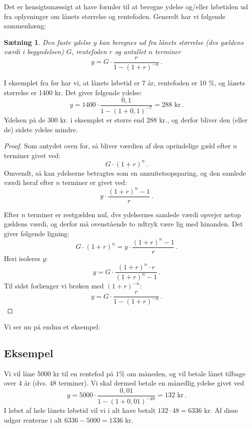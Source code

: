 \documentclass[12pt,oneside,a4paper]{article}
\newtheorem{thm}{Sætning}[section]
\begin{document}
Det er hensigtsmæssigt at have formler til at beregne ydelse og/eller løbetiden
ud fra oplysninger om lånets størrelse og rentefoden.  Generelt har vi følgende
sammenhæng:

\begin{tcolorbox}
\begin{thm}
Den faste ydelse $y$ kan beregnes ud fra lånets størrelse (dvs gældens
værdi i begyndelsen) $G$, rentefoden $r$ og antallet $n$ terminer
\[
    y = G\cdot\frac{r}{1-(1+r)^{-n}}\,.
\]
\end{thm}
\end{tcolorbox}

I eksemplet fra før har vi, at lånets løbetid er 7 år, rentefoden er 10 $\%$, og
lånets størrelse er 1400 kr. Det giver følgende ydelse:
\[
y = 1400\cdot\frac{0,1}{1-(1+0,1)^{-7}} = 288 \,\,\mbox{kr}\,.
\]
Ydelsen på de 300 kr. i eksemplet er større end 288 kr., og derfor bliver den
(eller de) sidste ydelse mindre.

\begin{tcolorbox}
\begin{proof}
Som antydet oven for, så bliver værdien af den oprindelige gæld efter $n$ terminer givet ved:
\[
G \cdot (1+r)^n \,.
\]
Omvendt, så kan ydelserne betragtes som en annuitetsopsparing, og
den samlede værdi heraf efter $n$ terminer er givet ved:
\[
y \cdot \frac{(1+r)^n-1}{r} \,.
\]

Efter $n$ terminer er restgælden nul, dvs ydelsernes samlede værdi opvejer
netop gældens værdi,  og derfor må ovenstående to udtryk være lig med
hinanden.  Det giver følgende ligning:
\[
G \cdot (1+r)^n = y \cdot \frac{(1+r)^n-1}{r} \,.
\]
Heri isoleres $y$:
\[
y = G \cdot \frac{(1+r)^n \cdot r}{(1+r)^n - 1} \,.
\]
Til sidst forlænger vi brøken med $(1+r)^{-n}$:
\[
y = G \cdot \frac{r}{1 - (1+r)^{-n}} \,.
\]

\end{proof}
\end{tcolorbox}

Vi ser nu på endnu et eksempel:
\begin{tcolorbox}
\subsection*{Eksempel}
Vi vil låne 5000 kr til en rentefod på $1 \%$ om måneden, og vil betale lånet
tilbage over 4 år (dvs. 48 terminer).  Vi skal dermed betale en månedlig
ydelse givet ved
\[
    y = 5000\cdot\frac{0,01}{1-(1+0,01)^{-48}} = 132 \,\,\mbox {kr} \,. 
\]
I løbet af hele lånets løbetid vil vi i alt have betalt $132\cdot 48 = 6336$ kr. Af
disse udgør renterne i alt $6336-5000 = 1336$ kr.
\end{tcolorbox}
\end{document}
